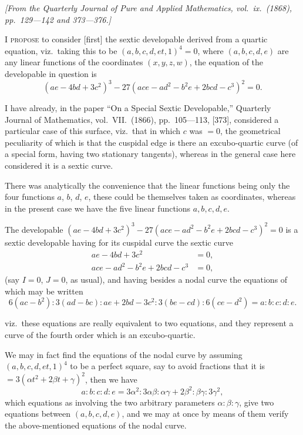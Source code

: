 \documentclass[11pt,a4paper]{article}
\theoremstyle{definition}
\begin{document}
\begin{flushright}
\textit{[From the Quarterly Journal of Pure and Applied Mathematics, vol.\ ix.\ (1868), pp.~129---142 and 373---376.]}
\end{flushright}

\vspace{0.5em}

I \textsc{propose} to consider [first] the sextic developable derived from a quartic equation, viz.\ taking this to be $(a,b,c,d,e t, 1)^4 = 0$, where $(a,b,c,d,e)$ are any linear functions of the coordinates $(x,y,z,w)$, the equation of the developable in question is
\[
(ae - 4bd + 3c^2)^3 - 27(ace - ad^2 - b^2e + 2bcd - c^3)^2 = 0.
\]

I have already, in the paper ``On a Special Sextic Developable,'' Quarterly Journal of Mathematics, vol.\ VII.\ (1866), pp.~105---113, [373], considered a particular case of this surface, viz.\ that in which $c$ was $= 0$, the geometrical peculiarity of which is that the cuspidal edge is there an excubo-quartic curve (of a special form, having two stationary tangents), whereas in the general case here considered it is a sextic curve.

There was analytically the convenience that the linear functions being only the four functions $a$, $b$, $d$, $e$, these could be themselves taken as coordinates, whereas in the present case we have the five linear functions $a, b, c, d, e$.

The developable $(ae - 4bd + 3c^2)^3 - 27(ace - ad^2 - b^2e + 2bcd - c^3)^2 = 0$ is a sextic developable having for its cuspidal curve the sextic curve
\begin{align*}
ae - 4bd + 3c^2 &= 0,\\
ace - ad^2 - b^2e + 2bcd - c^3 &= 0,
\end{align*}
(say $I = 0$, $J = 0$, as usual), and having besides a nodal curve the equations of which may be written
\[
6(ac-b^2) : 3(ad-bc) : ae + 2bd - 3c^2 : 3(be-cd) : 6(ce-d^2) = a : b : c : d : e.
\]

\newpage

viz.\ these equations are really equivalent to two equations, and they represent a curve of the fourth order which is an excubo-quartic.

We may in fact find the equations of the nodal curve by assuming $(a,b,c,d,e t, 1)^4$ to be a perfect square, say to avoid fractions that it is $= 3(\alpha t^2 + 2\beta t + \gamma)^2$, then we have
\[
a : b : c : d : e = 3\alpha^2 : 3\alpha\beta : \alpha\gamma + 2\beta^2 : \beta\gamma : 3\gamma^2,
\]
which equations as involving the two arbitrary parameters $\alpha : \beta : \gamma$, give two equations between $(a,b,c,d,e)$, and we may at once by means of them verify the above-mentioned equations of the nodal curve.
\end{document}
